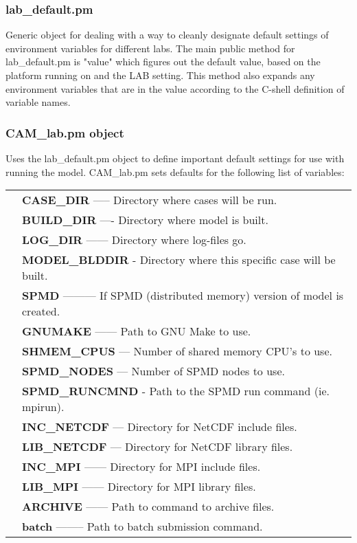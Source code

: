 \documentclass[]{article}
\begin{document}
\subsubsection{lab\_default.pm}
Generic object for dealing with a way to cleanly designate default settings of environment
variables for different labs. The main public method for lab\_default.pm is "value" which
figures out the default value, based on the platform running on and the LAB setting. This
method also expands any environment variables that are in the value according to
the C-shell definition of variable names.
\subsubsection{CAM\_lab.pm object}
Uses the lab\_default.pm object to define important default settings for use with running
the model. CAM\_lab.pm sets defaults for the following list of variables:\\
\begin{tabular}{r p{3.7in}}
	& {\bf CASE\_DIR} ----- Directory where cases will be run. \\
	& {\bf BUILD\_DIR} ---- Directory where model is built. \\
	& {\bf LOG\_DIR} ------ Directory where log-files go. \\
	& {\bf MODEL\_BLDDIR} - Directory where this specific case will be built. \\
	& {\bf SPMD} --------- If SPMD (distributed memory) version of model is created. \\
	& {\bf GNUMAKE} ------ Path to GNU Make to use. \\
	& {\bf SHMEM\_CPUS} --- Number of shared memory CPU's to use. \\
	& {\bf SPMD\_NODES} --- Number of SPMD nodes to use. \\
	& {\bf SPMD\_RUNCMND} - Path to the SPMD run command (ie. mpirun). \\
	& {\bf INC\_NETCDF} --- Directory for NetCDF include files. \\
	& {\bf LIB\_NETCDF} --- Directory for NetCDF library files. \\
	& {\bf INC\_MPI} ------ Directory for MPI include files. \\
	& {\bf LIB\_MPI} ------ Directory for MPI library files. \\
	& {\bf ARCHIVE} ------ Path to command to archive files. \\
	& {\bf batch} -------- Path to batch submission command.
\end{tabular} \\
\end{document}
